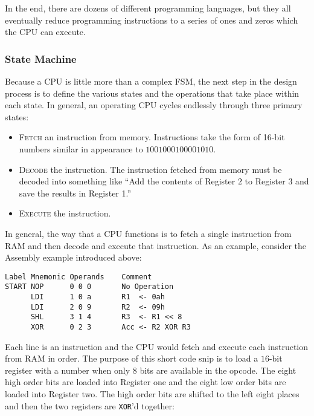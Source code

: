In the end, there are dozens of different programming languages, but they all eventually reduce programming instructions to a series of ones and zeros which the \ac{CPU} can execute.

\subsubsection{State Machine}

Because a \ac{CPU} is little more than a complex \ac{FSM}, the next step in the design process is to define the various states and the operations that take place within each state. In general, an operating \ac{CPU} cycles endlessly through three primary states:

\begin{itemize}
  \item \textsc{Fetch} an instruction from memory. Instructions take the form of 16-bit numbers similar in appearance to $ 1001 0001 0000 1010 $.
  \item \textsc{Decode} the instruction. The instruction fetched from memory must be decoded into something like ``Add the contents of Register $ 2 $ to Register $ 3 $ and save the results in Register 1.''
  \item \textsc{Execute} the instruction.
\end{itemize}

In general, the way that a \ac{CPU} functions is to fetch a single instruction from \ac{RAM} and then decode and execute that instruction. As an example, consider the Assembly example introduced above:

\begin{Verbatim}[commandchars=~\[\], samepage=true, fontfamily=courier]
Label Mnemonic Operands    Comment
START NOP      0 0 0       No Operation
      LDI      1 0 a       R1  <- 0ah
      LDI      2 0 9       R2  <- 09h
      SHL      3 1 4       R3  <- R1 << 8
      XOR      0 2 3       Acc <- R2 XOR R3
\end{Verbatim}

Each line is an instruction and the \ac{CPU} would fetch and execute each instruction from \ac{RAM} in order. The purpose of this short code snip is to load a $ 16 $-bit register with a number when only $ 8 $ bits are available in the opcode. The eight high order bits are loaded into Register one and the eight low order bits are loaded into Register two. The high order bits are shifted to the left eight places and then the two registers are \lstinline[columns=fixed]|XOR|'d together:

